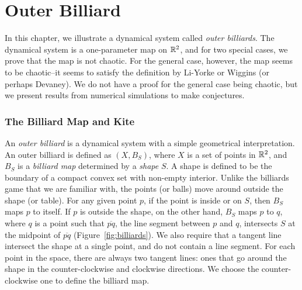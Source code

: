 \documentclass[10pt,twoside,draft]{book}
\begin{document}
\label{chap:billiards}
\chapter{Outer Billiard}
In this chapter, we illustrate a dynamical system called \textit{outer billiards}.
The dynamical system is a one-parameter map on $\mathbb{R}^2$, and for two special cases, we prove that the map is not chaotic.
For the general case, however, the map seems to be chaotic--it seems to satisfy the definition by Li-Yorke or Wiggins (or perhaps Devaney).
We do not have a proof for the general case being chaotic, but we present results from numerical simulations to make conjectures.

\subsection*{The Billiard Map and Kite}
An \textit{outer billiard} is a dynamical system with a simple geometrical interpretation.
An outer billiard is defined as $(X, B_S)$, where $X$ is a set of points in $\mathbb{R}^2$, and $B_S$ is a \textit{billiard map} determined by a \textit{shape} $S$.
A shape is defined to be the boundary of a compact convex set with non-empty interior.
Unlike the billiards game that we are familiar with, the points (or balls) move around outside the shape (or table).
For any given point $p$, if the point is inside or on $S$, then $B_S$ maps $p$ to itself.
If $p$ is outside the shape, on the other hand, $B_S$ maps $p$ to $q$, where $q$ is a point such that $\overline{pq}$, the line segment between $p$ and $q$, intersects $S$ at the midpoint of $\overline{pq}$ (Figure~\ref{fig:billiards}).
We also require that a tangent line intersect the shape at a single point, and do not contain a line segment.
For each point in the space, there are always two tangent lines: ones that go around the shape in the counter-clockwise and clockwise directions.
We choose the counter-clockwise one to define the billiard map.
\end{document}
